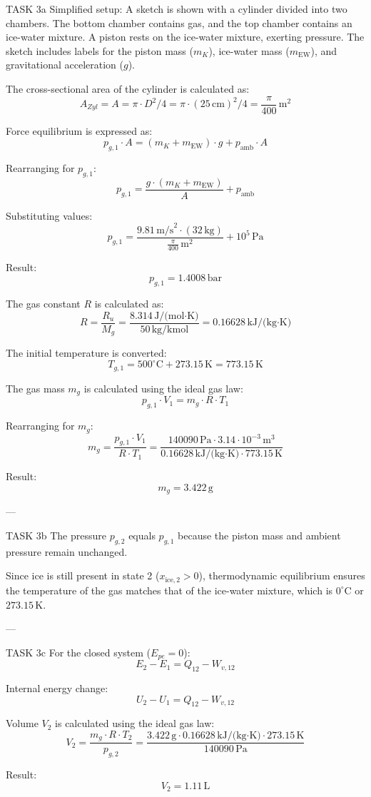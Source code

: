 TASK 3a  
Simplified setup:  
A sketch is shown with a cylinder divided into two chambers. The bottom chamber contains gas, and the top chamber contains an ice-water mixture. A piston rests on the ice-water mixture, exerting pressure. The sketch includes labels for the piston mass (\(m_K\)), ice-water mass (\(m_{\text{EW}}\)), and gravitational acceleration (\(g\)).

The cross-sectional area of the cylinder is calculated as:  
\[
A_{Zyl} = A = \pi \cdot D^2 / 4 = \pi \cdot (25 \, \text{cm})^2 / 4 = \frac{\pi}{400} \, \text{m}^2
\]

Force equilibrium is expressed as:  
\[
p_{g,1} \cdot A = (m_K + m_{\text{EW}}) \cdot g + p_{\text{amb}} \cdot A
\]

Rearranging for \(p_{g,1}\):  
\[
p_{g,1} = \frac{g \cdot (m_K + m_{\text{EW}})}{A} + p_{\text{amb}}
\]

Substituting values:  
\[
p_{g,1} = \frac{9.81 \, \text{m/s}^2 \cdot (32 \, \text{kg})}{\frac{\pi}{400} \, \text{m}^2} + 10^5 \, \text{Pa}
\]

Result:  
\[
p_{g,1} = 1.4008 \, \text{bar}
\]

The gas constant \(R\) is calculated as:  
\[
R = \frac{R_u}{M_g} = \frac{8.314 \, \text{J/(mol·K)}}{50 \, \text{kg/kmol}} = 0.16628 \, \text{kJ/(kg·K)}
\]

The initial temperature is converted:  
\[
T_{g,1} = 500^\circ\text{C} + 273.15 \, \text{K} = 773.15 \, \text{K}
\]

The gas mass \(m_g\) is calculated using the ideal gas law:  
\[
p_{g,1} \cdot V_1 = m_g \cdot R \cdot T_1
\]

Rearranging for \(m_g\):  
\[
m_g = \frac{p_{g,1} \cdot V_1}{R \cdot T_1} = \frac{140090 \, \text{Pa} \cdot 3.14 \cdot 10^{-3} \, \text{m}^3}{0.16628 \, \text{kJ/(kg·K)} \cdot 773.15 \, \text{K}}
\]

Result:  
\[
m_g = 3.422 \, \text{g}
\]

---

TASK 3b  
The pressure \(p_{g,2}\) equals \(p_{g,1}\) because the piston mass and ambient pressure remain unchanged.  

Since ice is still present in state 2 (\(x_{\text{ice},2} > 0\)), thermodynamic equilibrium ensures the temperature of the gas matches that of the ice-water mixture, which is \(0^\circ\text{C}\) or \(273.15 \, \text{K}\).

---

TASK 3c  
For the closed system (\(E_{pe} = 0\)):  
\[
E_2 - E_1 = Q_{12} - W_{v,12}
\]

Internal energy change:  
\[
U_2 - U_1 = Q_{12} - W_{v,12}
\]

Volume \(V_2\) is calculated using the ideal gas law:  
\[
V_2 = \frac{m_g \cdot R \cdot T_2}{p_{g,2}} = \frac{3.422 \, \text{g} \cdot 0.16628 \, \text{kJ/(kg·K)} \cdot 273.15 \, \text{K}}{140090 \, \text{Pa}}
\]

Result:  
\[
V_2 = 1.11 \, \text{L}
\]